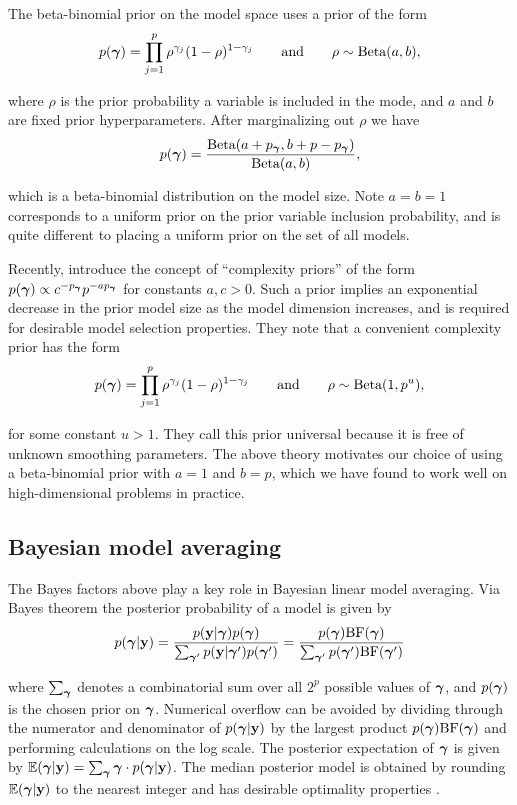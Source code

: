 The beta-binomial prior on the model space uses a
prior of the form
$$
\displaystyle p({\boldsymbol \gamma}) = \prod_{j=1}^p \rho^{\gamma_j} (1 - \rho)^{1 - \gamma_j} \qquad \mbox{and} \qquad \rho \sim \mbox{Beta}(a,b),
$$

\noindent where $\rho$ is the prior probability a variable is included in the mode, and $a$ and $b$ 
are fixed prior hyperparameters. After marginalizing out $\rho$ we have
\begin{equation}\label{eq:betabinomial}
\displaystyle p({\boldsymbol \gamma}) = \frac{\mbox{Beta}(a + p_{\boldsymbol \gamma},b + p - p_{\boldsymbol \gamma})}{\mbox{Beta}(a,b)},
\end{equation} 

\noindent which is a beta-binomial distribution on the model size. Note $a=b=1$ corresponds to a uniform prior on the 
prior variable inclusion probability, and is quite different to placing a uniform prior on the set of all models.


Recently, \cite{castillo2015} introduce the concept of ``complexity priors'' of the form
$p({\boldsymbol \gamma}) \propto c^{-p_{\boldsymbol \gamma}} p^{-a p_{\boldsymbol \gamma}}$
for constants $a, c>0$. Such a prior implies an exponential decrease in the prior model size
as the model dimension increases, and is required for desirable model selection properties. They note that a convenient complexity prior has the form 
$$
\displaystyle p({\boldsymbol \gamma}) = \prod_{j=1}^p \rho^{\gamma_j} (1 - \rho)^{1 - \gamma_j} \qquad \mbox{and} \qquad \rho \sim \mbox{Beta}(1,p^u),
$$

\noindent for some constant $u>1$. They call this prior universal because it is free of unknown smoothing
parameters. The above theory motivates our choice of using a beta-binomial prior with $a=1$ and $b=p$, which
we have found to work well on high-dimensional problems in practice.

\subsection{Bayesian model averaging}


The Bayes factors above play a key role in Bayesian linear model averaging.
Via Bayes theorem the posterior
probability of a model is given by
$$
\displaystyle p({\boldsymbol \gamma}|{\bf y}) = \frac{p({\bf y}|{\boldsymbol \gamma})p({\boldsymbol \gamma})}{\sum_{{\boldsymbol \gamma}'} p({\bf y}|{\boldsymbol \gamma}')p({\boldsymbol \gamma}')} = \frac{p({\boldsymbol \gamma})\mbox{BF}({\boldsymbol \gamma})}{\sum_{{\boldsymbol \gamma}'} p({\boldsymbol \gamma}')\mbox{BF}({\boldsymbol \gamma}')}
$$

\noindent where $\sum_{{\boldsymbol \gamma}}$ denotes a combinatorial sum over all
$2^p$ possible values of ${\boldsymbol \gamma}$, and $p({\boldsymbol \gamma})$ is
the chosen prior on ${\boldsymbol \gamma}$. Numerical overflow can be avoided by dividing
through the numerator and denominator of $p({\boldsymbol \gamma}|{\bf y})$ by the largest
product $p({\boldsymbol \gamma})\mbox{BF}({\boldsymbol \gamma})$ and performing calculations  on the log scale.
The 
posterior expectation of ${\boldsymbol \gamma}$ is given by
${\mathbb E}({\boldsymbol \gamma}|{\bf y}) = \sum_{{\boldsymbol \gamma}} {\boldsymbol \gamma} \cdot p({\boldsymbol \gamma}|{\bf y})$.
The
median posterior model  is obtained by
rounding ${\mathbb E}({\boldsymbol \gamma}|{\bf y})$ to the nearest integer and has desirable
optimality properties \citep{Barbieri2004}.
 
